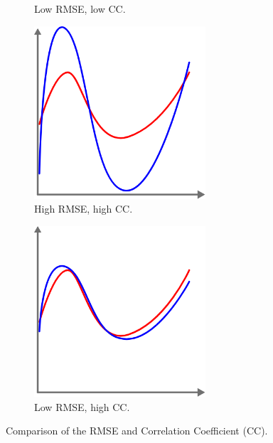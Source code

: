 \begin{figure}
\begin{subfigure}{0.3\textwidth}
        \caption{Low RMSE, low CC.}
        \label{fig: low_rmse}
    \end{subfigure}
    \begin{subfigure}{0.3\textwidth}
        \vspace{1cm}
        \centering
        \includegraphics[width=0.7\textwidth]{resources/images/high_corr.png}
        \caption{High RMSE, high CC.}
        \label{fig: high_corr}
    \end{subfigure}
    \hspace{1.5cm}
    \begin{subfigure}{0.3\textwidth}
        \vspace{1cm}
        \centering
        \includegraphics[width=0.7\textwidth]{resources/images/low_rmse_high_corr.png}
        \caption{Low RMSE, high CC.}
        \label{fig: low_rmse_high_corr}
    \end{subfigure}
    \caption{Comparison of the RMSE and Correlation Coefficient (CC).}
\end{figure}

